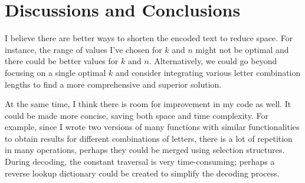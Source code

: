 \documentclass[12pt]{article}
\begin{document}
\section{Discussions and Conclusions} 
\par I believe there are better ways to shorten the encoded text to reduce space. For instance, the range of values I've chosen for $k$ and $n$ might not be optimal and there could be better values for $k$ and $n$. Alternatively, we could go beyond focusing on a single optimal $k$ and consider integrating various letter combination lengths to find a more comprehensive and superior solution.
\par At the same time, I think there is room for improvement in my code as well. It could be made more concise, saving both space and time complexity. For example, since I wrote two versions of many functions with similar functionalities to obtain results for different combinations of letters, there is a lot of repetition in many operations, perhaps they could be merged using selection structures. During decoding, the constant traversal is very time-consuming; perhaps a reverse lookup dictionary could be created to simplify the decoding process.
\end{document}
